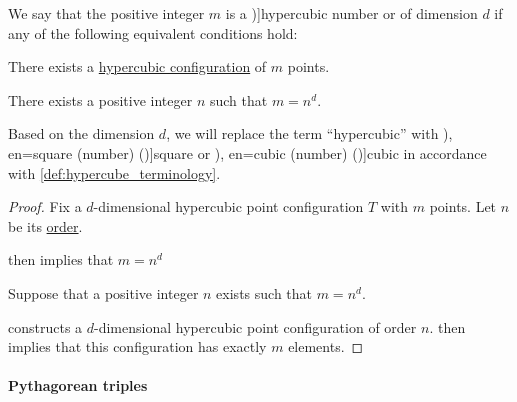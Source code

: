 \begin{definition}\label{def:hypercubic_number}
  We say that the positive integer \( m \) is a \term[en=hypercube number (\cite[\S 3.2.4]{Deza2012FigurateNumbers})]{hypercubic number} or  of dimension \( d \) if any of the following equivalent conditions hold:
  \begin{thmenum}
    \mimprovised There exists a \hyperref[def:hypercubic_point_configuration]{hypercubic configuration} of \( m \) points.

     There exists a positive integer \( n \) such that \( m = n^d \).
  \end{thmenum}

  Based on the dimension \( d \), we will replace the term \enquote{hypercubic} with \term[ru=квадратное (число) (\cite[14]{Розенфельд1963ОсновныеПонятиеГеометрии}), en=square (number) (\cite[1]{Deza2012FigurateNumbers})]{square} or \term[ru=кубическое (число) (\cite[14]{Розенфельд1963ОсновныеПонятиеГеометрии}), en=cubic (number) (\cite[1]{Deza2012FigurateNumbers})]{cubic} in accordance with \cref{def:hypercube_terminology}.
\end{definition}
\begin{proof}
   Fix a \( d \)-dimensional hypercubic point configuration \( T \) with \( m \) points. Let \( n \) be its \hyperref[def:hypercubic_point_configuration_order]{order}.

   then implies that \( m = n^d \)

   Suppose that a positive integer \( n \) exists such that \( m = n^d \).

   constructs a \( d \)-dimensional hypercubic point configuration of order \( n \).  then implies that this configuration has exactly \( m \) elements.
\end{proof}

\paragraph{Pythagorean triples}

